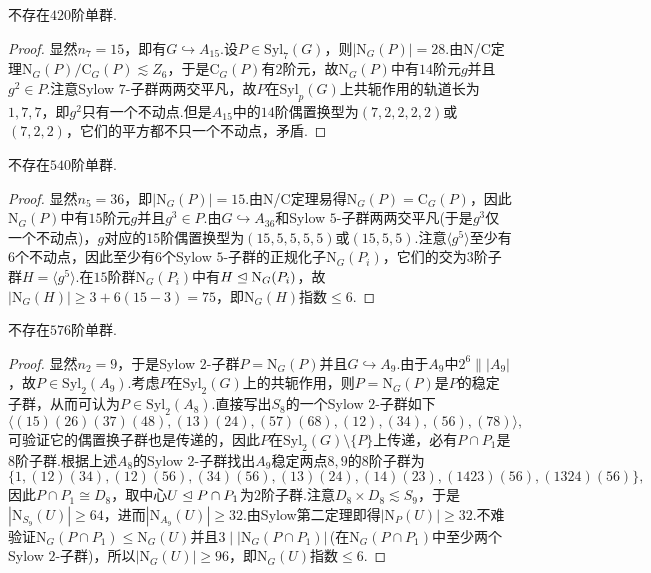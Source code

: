 \begin{lemma}
	不存在$420$阶单群.
\end{lemma}
\begin{proof}
	显然$n_7=15$，即有$G\hookrightarrow A_{15}$.设$P\in\mathrm{Syl}_7(G)$，则$|\mathrm{N}_G(P)|=28$.由N/C定理$\mathrm{N}_G(P)/\mathrm{C}_G(P)\lesssim Z_6$，于是$\mathrm{C}_G(P)$有$2$阶元，故$\mathrm{N}_G(P)$中有$14$阶元$g$并且$g^2\in P$.注意Sylow $7$-子群两两交平凡，故$P$在$\mathrm{Syl}_p(G)$上共轭作用的轨道长为$1,7,7$，即$g^2$只有一个不动点.但是$A_{15}$中的$14$阶偶置换型为$(7,2,2,2,2)$或$(7,2,2)$，它们的平方都不只一个不动点，矛盾.
\end{proof}
\begin{lemma}
	不存在$540$阶单群.
\end{lemma}
\begin{proof}
	显然$n_5=36$，即$|\mathrm{N}_G(P)|=15$.由N/C定理易得$\mathrm{N}_G(P)=\mathrm{C}_G(P)$，因此$\mathrm{N}_G(P)$中有$15$阶元$g$并且$g^3\in P$.由$G\hookrightarrow A_{36}$和Sylow $5$-子群两两交平凡(于是$g^3$仅一个不动点)，$g$对应的$15$阶偶置换型为$(15,5,5,5,5)$或$(15,5,5)$.注意$\langle g^5\rangle $至少有$6$个不动点，因此至少有$6$个Sylow $5$-子群的正规化子$\mathrm{N}_G(P_i)$，它们的交为$3$阶子群$H=\langle g^5\rangle $.在$15$阶群$\mathrm{N}_G(P_i)$中有$H\trianglelefteq\mathrm{N}_G(P_i)$，故$|\mathrm{N}_G(H)|\ge 3+6(15-3)=75$，即$\mathrm{N}_G(H)$指数$\le 6$.
\end{proof}
\begin{lemma}
	不存在$576$阶单群.
\end{lemma}
\begin{proof}
	显然$n_2=9$，于是Sylow $2$-子群$P=\mathrm{N}_G(P)$并且$G\hookrightarrow A_9$.由于$A_9$中$2^6\parallel|A_9|$，故$P\in\mathrm{Syl}_2(A_9)$.考虑$P$在$\mathrm{Syl}_2(G)$上的共轭作用，则$P=\mathrm{N}_G(P)$是$P$的稳定子群，从而可认为$P\in\mathrm{Syl}_2(A_8)$.直接写出$S_8$的一个Sylow $2$-子群如下
	\[
		\langle (15)(26)(37)(48),(13)(24),(57)(68),(12),(34),(56),(78)\rangle,
	\]
	可验证它的偶置换子群也是传递的，因此$P$在$\mathrm{Syl}_2(G)\setminus\{P\}$上传递，必有$P\cap P_1$是$8$阶子群.根据上述$A_8$的Sylow $2$-子群找出$A_9$稳定两点$8,9$的$8$阶子群为
	\[
		\{1,(12)(34),(12)(56),(34)(56),(13)(24),(14)(23),(1423)(56),(1324)(56)\},
	\]
	因此$P\cap P_1\cong D_8$，取中心$U\trianglelefteq P\cap P_1$为$2$阶子群.注意$D_8\times D_8\lesssim S_9$，于是$|\mathrm{N}_{S_9}(U)|\ge 64$，进而$|\mathrm{N}_{A_9}(U)|\ge 32$.由Sylow第二定理即得$|\mathrm{N}_P(U)|\ge 32$.不难验证$\mathrm{N}_G(P\cap P_1)\le\mathrm{N}_G(U)$并且$3\mid|\mathrm{N}_G(P\cap P_1)|$\,(在$\mathrm{N}_G(P\cap P_1)$中至少两个Sylow $2$-子群)，所以$|\mathrm{N}_G(U)|\ge 96$，即$\mathrm{N}_G(U)$指数$\le 6$.
\end{proof}
